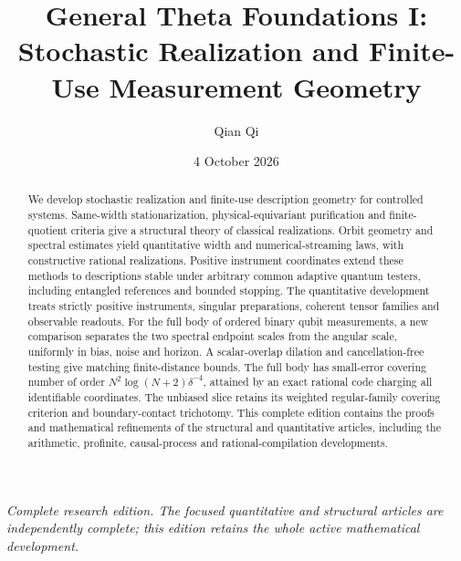 \documentclass[11pt]{amsart}
\title[General Theta Foundations I]{General Theta Foundations I:\\Stochastic Realization and Finite-Use Measurement Geometry}
\author{Qian Qi}
\date{4 October 2026}
\numberwithin{equation}{section}
\theoremstyle{definition}\newtheorem{definition}[theorem]{Definition}
\theoremstyle{remark}\newtheorem{remark}[theorem]{Remark}
\begin{document}
\raggedbottom
\begin{abstract}
We develop stochastic realization and finite-use description geometry
for controlled systems. Same-width stationarization, physical-equivariant
purification and finite-quotient criteria give a structural theory of
classical realizations. Orbit geometry and spectral estimates yield
quantitative width and numerical-streaming laws, with constructive
rational realizations. Positive instrument coordinates extend these
methods to descriptions stable under arbitrary common adaptive quantum
testers, including entangled references and bounded stopping.
The quantitative development treats strictly positive instruments,
singular preparations, coherent tensor families and observable readouts.
For the full body of ordered binary qubit measurements, a new comparison
separates the two spectral endpoint scales from the angular scale,
uniformly in bias, noise and horizon. A scalar-overlap dilation and
cancellation-free testing give matching finite-distance bounds. The full
body has small-error covering number of order
$N^2\log(N+2)\delta^{-4}$, attained by an exact rational code charging all
identifiable coordinates. The unbiased slice retains its weighted
regular-family covering criterion and boundary-contact trichotomy.
This complete edition contains the proofs and mathematical refinements
of the structural and quantitative articles, including the arithmetic,
profinite, causal-process and rational-compilation developments.
\end{abstract}
\maketitle
\noindent\textit{Complete research edition. The focused quantitative and structural articles are independently complete; this edition retains the whole active mathematical development.}
\end{document}
